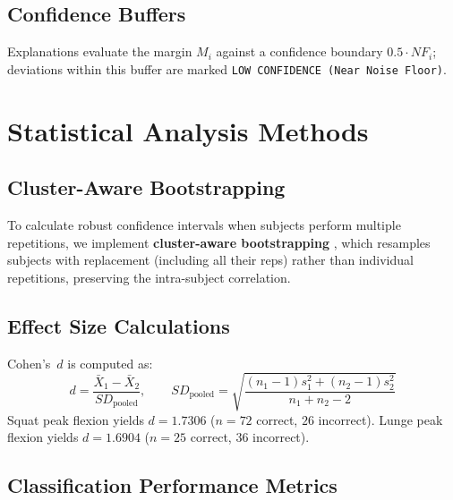 \subsection{Confidence Buffers}
\label{sec:confidence-buffers}

Explanations evaluate the margin $M_i$ against a confidence boundary $0.5 \cdot NF_i$; deviations within this buffer are marked \texttt{LOW CONFIDENCE (Near Noise Floor)}.


\section{Statistical Analysis Methods}
\label{sec:statistics}

\subsection{Cluster-Aware Bootstrapping}
\label{sec:bootstrapping}

To calculate robust confidence intervals when subjects perform multiple repetitions, we implement \textbf{cluster-aware bootstrapping} \citep{Field_Welsh_2007}, which resamples subjects with replacement (including all their reps) rather than individual repetitions, preserving the intra-subject correlation.

\subsection{Effect Size Calculations}
\label{sec:effect-size}

Cohen's~$d$ \citep{Cohens_d_1988} is computed as:
\begin{equation}
  d = \frac{\bar{X}_1 - \bar{X}_2}{SD_{\text{pooled}}}, \qquad
  SD_{\text{pooled}} = \sqrt{\frac{(n_1-1)s_1^2 + (n_2-1)s_2^2}{n_1+n_2-2}}
  \label{eq:cohens-d}
\end{equation}
Squat peak flexion yields $d = 1.7306$ ($n=72$ correct, $26$ incorrect). Lunge peak flexion yields $d = 1.6904$ ($n=25$ correct, $36$ incorrect).

\subsection{Classification Performance Metrics}
\label{sec:classification-metrics}

